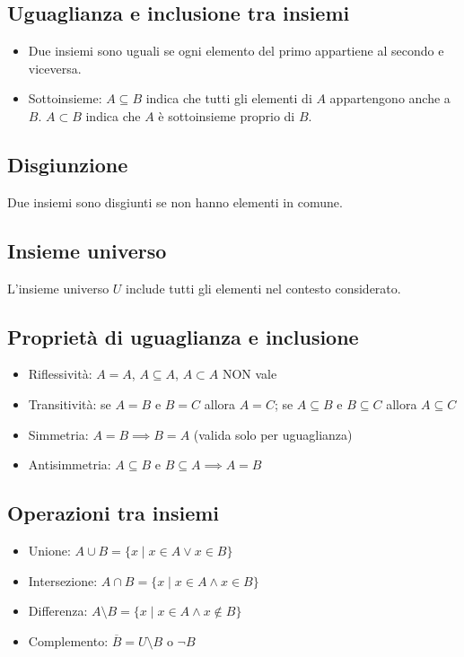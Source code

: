 \documentclass[a4paper,12pt]{article}
\begin{document}
\subsection{Uguaglianza e inclusione tra insiemi}
\begin{itemize}
    \item Due insiemi sono uguali se ogni elemento del primo appartiene al secondo e viceversa.
    \item Sottoinsieme: $A \subseteq B$ indica che tutti gli elementi di $A$ appartengono anche a $B$.  
    $A \subset B$ indica che $A$ è sottoinsieme proprio di $B$.
\end{itemize}

\subsection{Disgiunzione}
Due insiemi sono disgiunti se non hanno elementi in comune.

\subsection{Insieme universo}
L’insieme universo $U$ include tutti gli elementi nel contesto considerato.

\subsection{Proprietà di uguaglianza e inclusione}
\begin{itemize}
    \item Riflessività: $A = A$, $A \subseteq A$, $A \subset A$ NON vale
    \item Transitività: se $A=B$ e $B=C$ allora $A=C$; se $A\subseteq B$ e $B\subseteq C$ allora $A\subseteq C$
    \item Simmetria: $A=B \implies B=A$ (valida solo per uguaglianza)
    \item Antisimmetria: $A \subseteq B$ e $B \subseteq A \implies A=B$
\end{itemize}

\subsection{Operazioni tra insiemi}
\begin{itemize}
    \item Unione: $A \cup B = \{x \mid x \in A \vee x \in B\}$
    \item Intersezione: $A \cap B = \{x \mid x \in A \wedge x \in B\}$
    \item Differenza: $A \setminus B = \{x \mid x \in A \wedge x \notin B\}$
    \item Complemento: $\overline{B} = U \setminus B$ o $\neg B$
\end{itemize}
\end{document}
